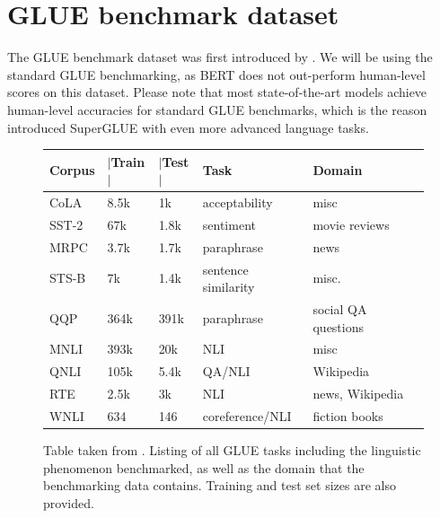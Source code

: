 \documentclass[a4paper,12pt,oneside,openright]{report}
\begin{document}
\section{GLUE benchmark dataset}

The GLUE benchmark dataset was first introduced by \cite{wang19}.
We will be using the standard GLUE benchmarking, as BERT does not out-perform human-level scores on this dataset.
Please note that most state-of-the-art models achieve human-level accuracies for standard GLUE benchmarks, which is the reason \cite{wang19b} introduced SuperGLUE with even more advanced language tasks.

\begin{figure}[h]
\center
\begin{tabular}{
 l %
 l %
 l
 l
 l
 l
}
\toprule
\textbf{Corpus} & \textbf{ $|$Train$|$ } &\textbf{$|$Test$|$} & \textbf{Task} & \textbf{Domain}  \\
\midrule
CoLA  & 8.5k  &  1k   & acceptability &  misc \\

SST-2 & 67k &  1.8k  & sentiment &  movie reviews \\

MRPC & 3.7k &  1.7k & paraphrase & news \\
          
STS-B & 7k &  1.4k    & sentence similarity &  misc. \\
      
QQP & 364k &  391k & paraphrase  &  social QA questions\\	

MNLI & 393k &  20k  & NLI  &  misc \\

QNLI & 105k &  5.4k & QA/NLI &  Wikipedia \\

RTE & 2.5k &  3k      & NLI &  news, Wikipedia \\

WNLI & 634 &  146   & coreference/NLI & fiction books \\

      
\bottomrule
\end{tabular}
\caption{Table taken from \cite{wang19}. Listing of all GLUE tasks including the linguistic phenomenon benchmarked, as well as the domain that the benchmarking data contains. Training and test set sizes are also provided.}
\end{figure}
\end{document}
